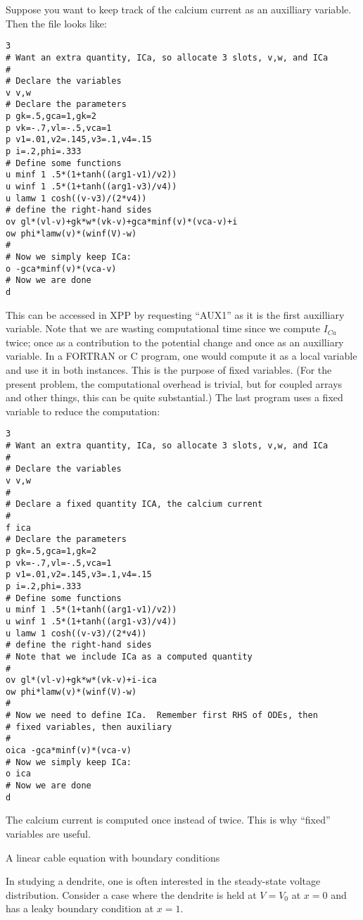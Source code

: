 Suppose you want to keep track of the calcium current as an auxilliary
variable.  Then the file looks like:
\begin{verbatim}
3
# Want an extra quantity, ICa, so allocate 3 slots, v,w, and ICa
#
# Declare the variables
v v,w
# Declare the parameters
p gk=.5,gca=1,gk=2
p vk=-.7,vl=-.5,vca=1
p v1=.01,v2=.145,v3=.1,v4=.15
p i=.2,phi=.333     
# Define some functions
u minf 1 .5*(1+tanh((arg1-v1)/v2))
u winf 1 .5*(1+tanh((arg1-v3)/v4))
u lamw 1 cosh((v-v3)/(2*v4))
# define the right-hand sides
ov gl*(vl-v)+gk*w*(vk-v)+gca*minf(v)*(vca-v)+i
ow phi*lamw(v)*(winf(V)-w)
#
# Now we simply keep ICa:
o -gca*minf(v)*(vca-v)
# Now we are done
d
\end{verbatim}
This can be accessed in XPP by requesting ``AUX1'' as it is the first
auxilliary variable.  Note that we are wasting computational time
since we compute $I_{Ca}$ twice; once as a contribution to the
potential change and once as an auxilliary variable.  In a FORTRAN or
C program, one would compute it as a local variable and use it in both
instances.  This is the purpose of fixed variables.  (For the present
problem, the computational overhead is trivial, but for coupled arrays
and other things, this can be quite substantial.)  The last program
uses a fixed variable to reduce the computation:
\begin{verbatim}
3
# Want an extra quantity, ICa, so allocate 3 slots, v,w, and ICa
#
# Declare the variables
v v,w
#
# Declare a fixed quantity ICA, the calcium current
#
f ica
# Declare the parameters
p gk=.5,gca=1,gk=2
p vk=-.7,vl=-.5,vca=1
p v1=.01,v2=.145,v3=.1,v4=.15
p i=.2,phi=.333     
# Define some functions
u minf 1 .5*(1+tanh((arg1-v1)/v2))
u winf 1 .5*(1+tanh((arg1-v3)/v4))
u lamw 1 cosh((v-v3)/(2*v4))
# define the right-hand sides
# Note that we include ICa as a computed quantity
#
ov gl*(vl-v)+gk*w*(vk-v)+i-ica
ow phi*lamw(v)*(winf(V)-w)
#
# Now we need to define ICa.  Remember first RHS of ODEs, then 
# fixed variables, then auxiliary
#
oica -gca*minf(v)*(vca-v) 
# Now we simply keep ICa:
o ica
# Now we are done
d
\end{verbatim}
The calcium current is computed once instead of twice.  This is why
``fixed'' variables are useful.  
 \begin{center}
A linear cable equation with boundary conditions
\end{center}
In studying a dendrite, one is often interested in the steady-state
voltage distribution.  Consider a case where the dendrite is held at
$V=V_0$ at $x=0$ and has a leaky boundary condition at $x=1.$
